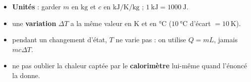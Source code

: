 \documentclass[11pt,a4paper]{article}
\begin{document}
\begin{piege}
\begin{itemize}[leftmargin=1.6em,topsep=2pt,itemsep=2pt]
  \item \textbf{Unités} : garder $m$ en $\si{\kilogram}$ et $c$ en $\si{\kilo\joule\per\kelvin\per\kilogram}$ ; $\qty{1}{\kilo\joule}=\qty{1000}{\joule}$.
  \item une \textbf{variation} $\Delta T$ a la même valeur en $\si{\kelvin}$ et en $\si{\celsius}$ (\;$\qty{10}{\celsius}$ d'écart $=\qty{10}{\kelvin}$\;).
  \item pendant un changement d'état, $T$ ne varie pas : on utilise $Q=mL$, jamais $mc\Delta T$.
  \item ne pas oublier la chaleur captée par le \textbf{calorimètre} lui-même quand l'énoncé la donne.
\end{itemize}
\end{piege}
\end{document}
